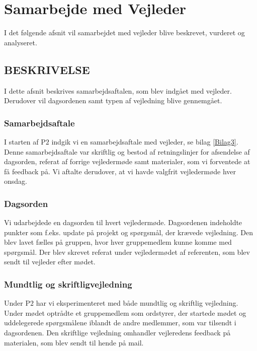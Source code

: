\chapter{Samarbejde med Vejleder}
I det følgende afsnit vil samarbejdet med vejleder blive beskrevet, vurderet og analyseret. 

\section{BESKRIVELSE}
I dette afsnit beskrives samarbejdsaftalen, som blev indgået med vejleder. Derudover vil dagsordenen samt typen af vejledning blive gennemgået.

\subsection{Samarbejdsaftale}
I starten af P$2$ indgik vi en samarbejdsaftale med vejleder, se bilag \ref{Bilag3}. Denne samarbejdsaftale var skriftlig og bestod af retningslinjer for afsendelse af dagsorden, referat af forrige vejledermøde samt materialer, som vi forventede at få feedback på. Vi aftalte derudover, at vi havde valgfrit vejledermøde hver onsdag.

\subsection{Dagsorden}
Vi udarbejdede en dagsorden til hvert vejledermøde. Dagsordenen indeholdte punkter som f.eks. update på projekt og spørgsmål, der krævede vejledning. Den blev lavet fælles på gruppen, hvor hver gruppemedlem kunne komme med spørgsmål. Der blev skrevet referat under vejledermødet af referenten, som blev sendt til vejleder efter mødet.

\subsection{Mundtlig og skriftligvejledning}
Under P$2$ har vi eksperimenteret med både mundtlig og skriftlig vejledning. Under mødet optrådte et gruppemedlem som ordstyrer, der startede mødet og uddelegerede spørgsmålene iblandt de andre medlemmer, som var tilsendt i dagsordenen. Den skriftlige vejledning omhandler vejleredens feedback på materialen, som blev sendt til hende på mail.

